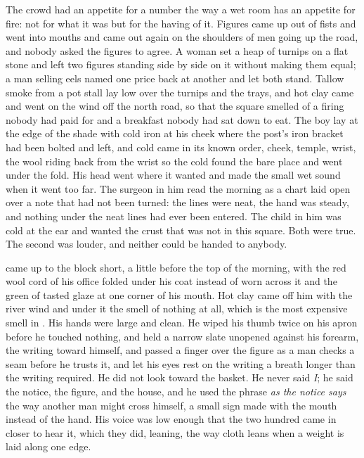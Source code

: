 The crowd had an appetite for a number the way a wet room has an appetite for fire: not for what it was but for the having of it. Figures came up out of fists and went into mouths and came out again on the shoulders of men going up the road, and nobody asked the figures to agree. A woman set a heap of turnips on a flat stone and left two figures standing side by side on it without making them equal; a man selling eels named one price back at another and let both stand. Tallow smoke from a pot stall lay low over the turnips and the trays, and hot clay came and went on the wind off the north road, so that the square smelled of a firing nobody had paid for and a breakfast nobody had sat down to eat. The boy lay at the edge of the shade with cold iron at his cheek where the post's iron bracket had been bolted and left, and cold came in its known order, cheek, temple, wrist, the wool riding back from the wrist so the cold found the bare place and went under the fold. His head went where it wanted and made the small wet sound when it went too far. The surgeon in him read the morning as a chart laid open over a note that had not been turned: the lines were neat, the hand was steady, and nothing under the neat lines had ever been entered. The child in him was cold at the ear and wanted the crust that was not in this square. Both were true. The second was louder, and neither could be handed to anybody.

 came up to the block short, a little before the top of the morning, with the red wool cord of his office folded under his coat instead of worn across it and the green of tasted glaze at one corner of his mouth. Hot clay came off him with the river wind and under it the smell of nothing at all, which is the most expensive smell in . His hands were large and clean. He wiped his thumb twice on his apron before he touched nothing, and held a narrow slate unopened against his forearm, the writing toward himself, and passed a finger over the figure as a man checks a seam before he trusts it, and let his eyes rest on the writing a breath longer than the writing required. He did not look toward the basket. He never said \emph{I}; he said the notice, the figure,  and the house, and he used the phrase \emph{as the notice says} the way another man might cross himself, a small sign made with the mouth instead of the hand. His voice was low enough that the two hundred came in closer to hear it, which they did, leaning, the way cloth leans when a weight is laid along one edge.

